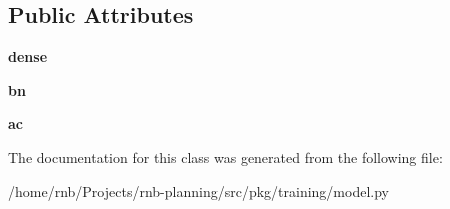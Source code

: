 \subsection*{Public Attributes}
\begin{DoxyCompactItemize}
\item 
\mbox{\label{classrnb-planning_1_1src_1_1pkg_1_1training_1_1model_1_1_dense_b_n_afdd06871dffb1dddcbd52e79e038230b}} 
{\bfseries dense}
\item 
\mbox{\label{classrnb-planning_1_1src_1_1pkg_1_1training_1_1model_1_1_dense_b_n_a4ff0fb79b9d4874c33178f2448e8974a}} 
{\bfseries bn}
\item 
\mbox{\label{classrnb-planning_1_1src_1_1pkg_1_1training_1_1model_1_1_dense_b_n_a08da8a86db0a389fe328d7f980e1a56a}} 
{\bfseries ac}
\end{DoxyCompactItemize}


The documentation for this class was generated from the following file\+:\begin{DoxyCompactItemize}
\item 
/home/rnb/\+Projects/rnb-\/planning/src/pkg/training/model.\+py\end{DoxyCompactItemize}
